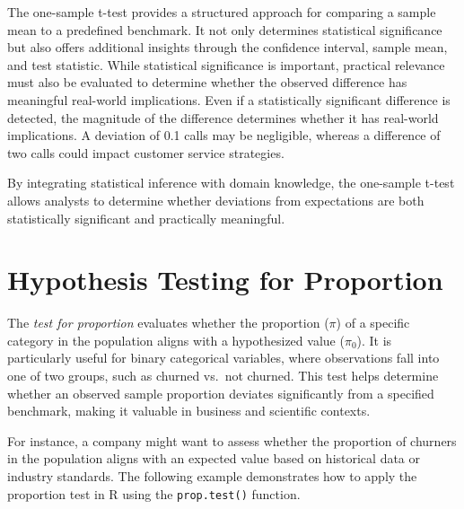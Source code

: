 \documentclass[
  11pt,
]{book}
\theoremstyle{definition}
\theoremstyle{definition}
\theoremstyle{definition}
\theoremstyle{definition}
\theoremstyle{remark}
\begin{document}
The one-sample t-test provides a structured approach for comparing a sample mean to a predefined benchmark. It not only determines statistical significance but also offers additional insights through the confidence interval, sample mean, and test statistic. While statistical significance is important, practical relevance must also be evaluated to determine whether the observed difference has meaningful real-world implications. Even if a statistically significant difference is detected, the magnitude of the difference determines whether it has real-world implications. A deviation of 0.1 calls may be negligible, whereas a difference of two calls could impact customer service strategies.

By integrating statistical inference with domain knowledge, the one-sample t-test allows analysts to determine whether deviations from expectations are both statistically significant and practically meaningful.

\section{Hypothesis Testing for Proportion}\label{hypothesis-testing-for-proportion}

The \emph{test for proportion} evaluates whether the proportion (\(\pi\)) of a specific category in the population aligns with a hypothesized value (\(\pi_0\)). It is particularly useful for binary categorical variables, where observations fall into one of two groups, such as churned vs.~not churned. This test helps determine whether an observed sample proportion deviates significantly from a specified benchmark, making it valuable in business and scientific contexts.

For instance, a company might want to assess whether the proportion of churners in the population aligns with an expected value based on historical data or industry standards. The following example demonstrates how to apply the proportion test in R using the \texttt{prop.test()} function.
\end{document}

